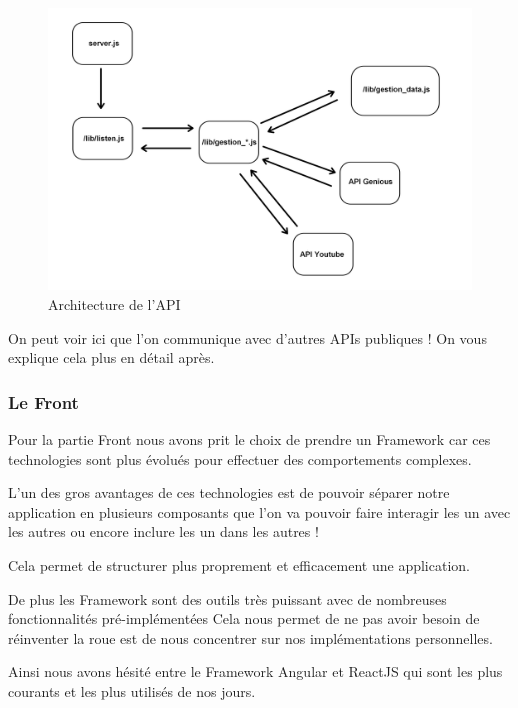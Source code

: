 \documentclass[12pt,french]{article}
\begin{document}
\begin{figure}[H]
	\centering
	\includegraphics[scale=0.16]{api.png}
	\caption{Architecture de l'API}    
\end{figure}

\medskip

On peut voir ici que l'on communique avec d'autres APIs publiques ! On vous explique cela plus en détail après.

\subsubsection{Le Front}

Pour la partie Front nous avons prit le choix de prendre un Framework car ces technologies sont plus évolués pour effectuer des comportements complexes.

\medskip

L'un des gros avantages de ces technologies est de pouvoir séparer notre application en plusieurs composants que l'on va pouvoir faire interagir les un avec les autres ou encore inclure les un dans les autres !

Cela permet de structurer plus proprement et efficacement une application.

\medskip

De plus les Framework sont des outils très puissant avec de nombreuses fonctionnalités pré-implémentées Cela nous permet de ne pas avoir besoin de réinventer la roue est de nous concentrer sur nos implémentations personnelles.

\medskip

Ainsi nous avons hésité entre le Framework Angular et ReactJS qui sont les plus courants et les plus utilisés de nos jours.
\end{document}

